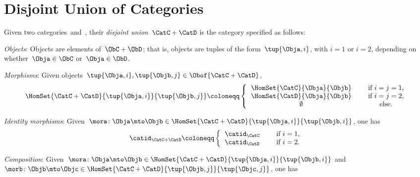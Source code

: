 
\section{Disjoint Union of Categories}

\begin{ctdefinition}
    \label{def:disjoint-union-category}
    Given two categories~\CatC and~\CatD, their \emph{disjoint union}~$\CatC + \CatD$ is the category specified as follows:
    \begin{compactenum}
        \item \emph{Objects}: Objects are elements of~$\ObC + \ObD$; that is, objects are tuples of the form~$\tup{\Obja, i}$, with $i=1$ or $i=2$, depending on whether~$\Obja \in \ObC$ or~$\Obja \in \ObD$.
        \item \emph{Morphisms}: Given objects~$\tup{\Obja, i}, \tup{\Objb, j} \in \Obof{\CatC + \CatD}$,
              \begin{equation}
                  \HomSet{\CatC + \CatD}{\tup{\Obja, i}}{\tup{\Objb, j}} \coloneqq
                  \left\{
                  \begin{tabular}{ccc}
                      $\HomSet{\CatC}{\Obja}{\Objb}$ &  & if $i=j = 1$,  \\
                      $\HomSet{\CatD}{\Obja}{\Objb}$ &  & if $i = j =2$, \\
                      $\emptyset$                    &  & else.
                  \end{tabular}
                  \right.
              \end{equation}
        \item \emph{Identity morphisms}: Given~$\mora\colon \Obja \mto \Objb\in \HomSet{\CatC + \CatD}{\tup{\Obja, i}}{\tup{\Objb, i}}$, one has
              \begin{equation}
                  \catid_{\CatC+\CatD} \coloneqq
                  \left\{
                  \begin{tabular}{ccc}
                      $\catid_\CatC$ &  & if $i=1$, \\
                      $\catid_\CatD$ &  & if $i=2$.
                  \end{tabular}
                  \right.
              \end{equation}
        \item \emph{Composition}: Given~$\mora\colon \Obja \mto \Objb\in \HomSet{\CatC + \CatD}{\tup{\Obja, i}}{\tup{\Objb, i}}$ and~$\morb\colon \Objb\mto \Objc\in \HomSet{\CatC + \CatD}{\tup{\Objb, j}}{\tup{\Objc, j}}$, one has

\end{compactenum}
\end{ctdefinition}

